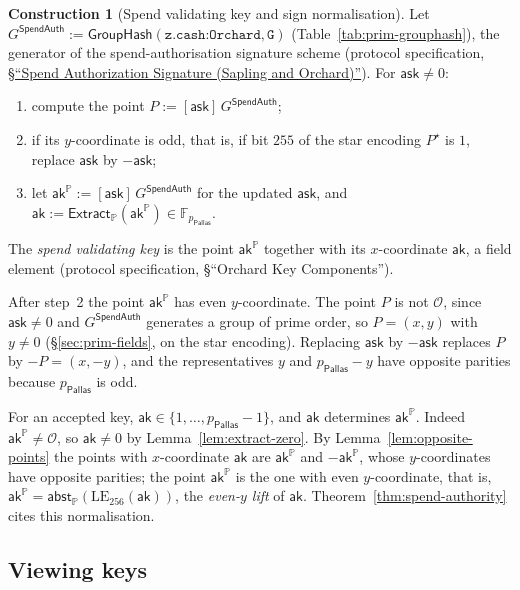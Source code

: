 \documentclass[11pt,a4paper]{article}
\theoremstyle{definition}
\newtheorem{construction}[theorem]{Construction}
\newcommand{\F}{\mathbb{F}}
\newcommand{\PP}{\mathbb{P}}
\newcommand{\Pallas}{\ensuremath{\mathsf{Pallas}}}
\newcommand{\Extract}{\ensuremath{\mathsf{Extract}}}
\newcommand{\GroupHash}{\ensuremath{\mathsf{GroupHash}}}
\newcommand{\ask}{\ensuremath{\mathsf{ask}}}
\newcommand{\aksym}{\ensuremath{\mathsf{ak}}}
\begin{document}
\begin{construction}[Spend validating key and sign normalisation]
Let $G^{\mathsf{SpendAuth}} := \GroupHash(\texttt{z.cash:Orchard},
\texttt{G})$ (Table~\ref{tab:prim-grouphash}), the generator of the
spend-authorisation signature scheme (protocol specification,
\href{https://zips.z.cash/protocol/protocol.pdf#concretespendauthsig}%
{\S``Spend Authorization Signature (Sapling and Orchard)''}).
For $\ask \neq 0$:
\begin{enumerate}
\item compute the point $P := [\ask]\,G^{\mathsf{SpendAuth}}$;
\item if its $y$-coordinate is odd, that is, if bit $255$ of the star
  encoding $P^{\star}$ is $1$, replace $\ask$ by $-\ask$;
\item let $\aksym^{\PP} := [\ask]\,G^{\mathsf{SpendAuth}}$ for the updated
  $\ask$, and $\aksym := \Extract_{\PP}(\aksym^{\PP}) \in
  \F_{p_{\Pallas}}$.
\end{enumerate}
The \emph{spend validating key} is the point $\aksym^{\PP}$ together with
its $x$-coordinate $\aksym$, a field element (protocol specification,
\S``Orchard Key Components'').
\end{construction}

After step~2 the point $\aksym^{\PP}$ has even $y$-coordinate. The point
$P$ is not $\mathcal{O}$, since $\ask \neq 0$ and $G^{\mathsf{SpendAuth}}$
generates a group of prime order, so $P = (x, y)$ with $y \neq 0$
(\S\ref{sec:prim-fields}, on the star encoding). Replacing $\ask$ by
$-\ask$ replaces $P$ by $-P = (x, -y)$, and the representatives $y$ and
$p_{\Pallas} - y$ have opposite parities because $p_{\Pallas}$ is odd.

For an accepted key, $\aksym \in \{1, \dots, p_{\Pallas} - 1\}$, and
$\aksym$ determines $\aksym^{\PP}$. Indeed $\aksym^{\PP} \neq \mathcal{O}$,
so $\aksym \neq 0$ by Lemma~\ref{lem:extract-zero}. By
Lemma~\ref{lem:opposite-points} the points with $x$-coordinate $\aksym$ are
$\aksym^{\PP}$ and $-\aksym^{\PP}$, whose $y$-coordinates have opposite
parities; the point $\aksym^{\PP}$ is the one with even $y$-coordinate, that
is, $\aksym^{\PP} = \mathsf{abst}_{\PP}(\mathrm{LE}_{256}(\aksym))$, the
\emph{even-$y$ lift} of $\aksym$. Theorem~\ref{thm:spend-authority} cites
this normalisation.

\FloatBarrier
\subsection{Viewing keys}\label{sec:keys-viewing}
\end{document}
